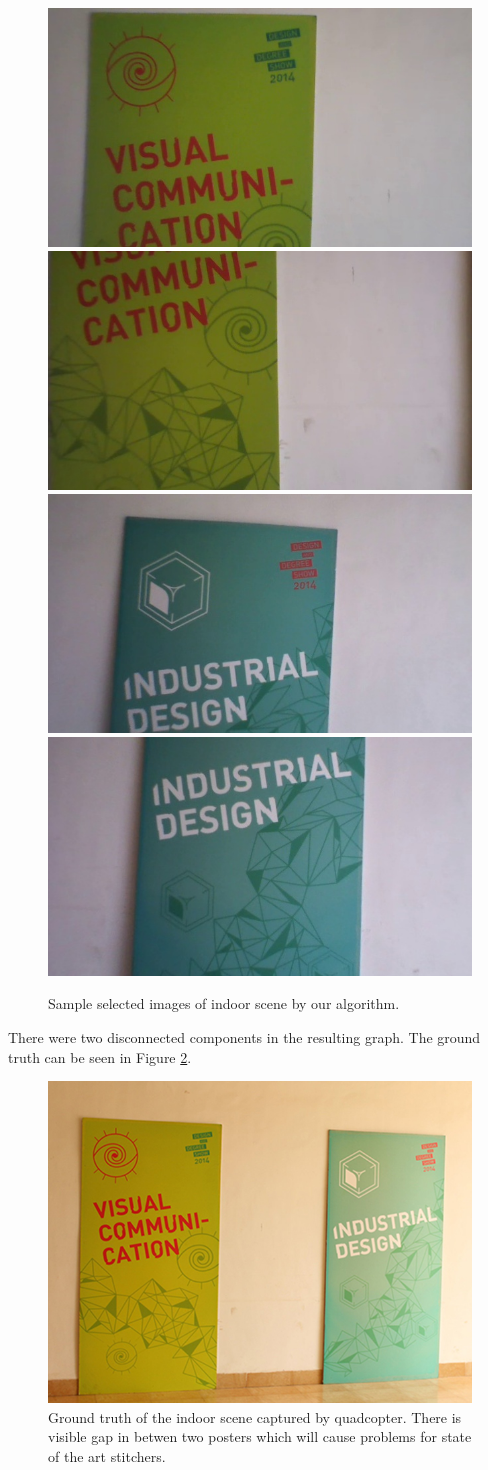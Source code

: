 \begin{figure}
\centering
\includegraphics[width=0.22\linewidth]{figures/idc_indoor/selected/1.jpg}
\includegraphics[width=0.22\linewidth]{figures/idc_indoor/selected/2.jpg}
\includegraphics[width=0.22\linewidth]{figures/idc_indoor/selected/3.jpg}
\includegraphics[width=0.22\linewidth]{figures/idc_indoor/selected/4.jpg}
\caption{Sample selected images of indoor scene by our algorithm.}
\label{fig:idc_selected}
\end{figure}

There were two disconnected components in the resulting graph. The ground truth
can be seen in Figure \ref{fig:idc_indoor_groundtruth}.

\begin{figure}
\includegraphics[width=\linewidth]{figures/idc_indoor/groundtruth.jpg}
\caption{Ground truth of the indoor scene captured by quadcopter. There is
visible gap in betwen two posters which will cause problems for state of the art
stitchers.}
\label{fig:idc_indoor_groundtruth}
\end{figure} 

